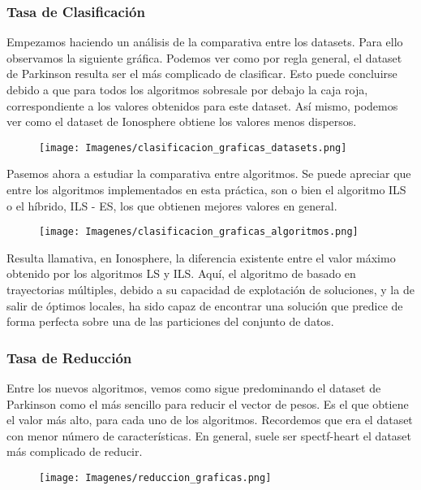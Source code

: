 \documentclass[10pt, a4paper]{article}
\theoremstyle{theorem-style}
\theoremstyle{theorem-style}
\theoremstyle{theorem2-style}
\theoremstyle{definition-style}
\theoremstyle{remark-style}
\theoremstyle{example-style}
\theoremstyle{definition-style}
\theoremstyle{remark-style}
\theoremstyle{remark-style}
\begin{document}
\subsubsection{Tasa de Clasificación}

Empezamos haciendo un análisis de la comparativa entre los datasets. Para ello observamos la siguiente gráfica. Podemos ver como por regla general, el dataset de Parkinson resulta ser el más complicado de clasificar. Esto puede concluirse debido a que para todos los algoritmos sobresale por debajo la caja roja, correspondiente a los valores obtenidos para este dataset. Así mismo, podemos ver como el dataset de Ionosphere obtiene los valores menos dispersos. 

\begin{figure}[htp]
\centering
\texttt{[image: Imagenes/clasificacion\_graficas\_datasets.png]}
\label{}
\end{figure}

Pasemos ahora a estudiar la comparativa entre algoritmos. Se puede apreciar que entre los algoritmos implementados en esta práctica, son o bien el algoritmo ILS o el híbrido, ILS - ES, los que obtienen mejores valores en general. 

\begin{figure}[htp]
\centering
\texttt{[image: Imagenes/clasificacion\_graficas\_algoritmos.png]}
\label{}
\end{figure}

Resulta llamativa, en Ionosphere, la diferencia existente entre el valor máximo obtenido por los algoritmos LS y ILS. Aquí, el algoritmo de basado en trayectorias múltiples, debido a su capacidad de explotación de soluciones, y la de salir de óptimos locales, ha sido capaz de encontrar una solución que predice de forma perfecta sobre una de las particiones del conjunto de datos. 

\subsubsection{Tasa de Reducción}

Entre los nuevos algoritmos, vemos como sigue predominando el dataset de Parkinson como el más sencillo para reducir el vector de pesos. Es el que obtiene el valor más alto, para cada uno de los algoritmos. Recordemos que era el dataset con menor número de características. En general, suele ser spectf-heart el dataset más complicado de reducir. 

\begin{figure}[htp]
\centering
\texttt{[image: Imagenes/reduccion\_graficas.png]}
\label{}
\end{figure}
\end{document}

